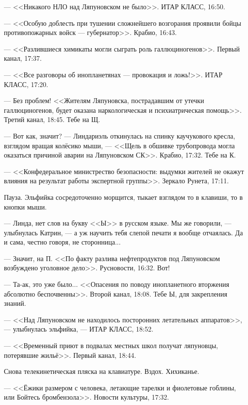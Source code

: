\emptypar


\emptypar







--- <<Никакого НЛО над Ляпуновском не было>>. ИТАР КЛАСС, 16:50.

--- <<Особую доблесть при тушении сложнейшего возгорания проявили бойцы противопожарных войск --- губернатор>>. Крабио, 16:43.

--- <<Разлившиеся химикаты могли сыграть роль галлюциногенов>>. Первый канал, 17:37.

--- <<Все разговоры об инопланетянах --- провокация и ложь!>>. ИТАР КЛАСС, 17:20.

--- Без проблем! <<Жителям Ляпуновска, пострадавшим от утечки галлюциногенов,
будет оказана наркологическая и психиатрическая помощь>>. Третий канал, 18:45. Тебе на Щ.

--- Вот как, значит? --- Линдариэль откинулась на спинку каучукового кресла, взглядом вращая колёсико мыши,
--- <<Щель в обшивке трубопровода могла оказаться причиной аварии на Ляпуновском СК>>. Крабио, 17:32. Тебе на К.

--- <<Конфедеральное министрество безопасности: выдумки жителей не окажут влияния на результат работы экспертной группы>>.
Зеркало Рунета, 17:11.

Пауза. Эльфийка сосредоточенно морщится, тыкает взглядом то в клавиши, то в кнопки мыши.

--- Линда, нет слов на букву <<Ы>> в русском языке. Мы же говорили, --- улыбнулась Катрин,
--- а уж научить тебя слепой печати я вообще отчаялась. Да и сама, честно говоря, не сторонница...

--- Значит, на П. <<По факту разлива нефтепродуктов под Ляпуновском возбуждено уголовное дело>>. Русновости, 16:32. Вот!

--- Та-ак, это уже было... <<Опасения по поводу инопланетного вторжения абсолютно беспочвенны>>.
Второй канал, 18:08. Тебе Ы, для закрепления знаний.

--- <<Над Ляпуновском не находилось посторонних летательных аппаратов>>, --- улыбнулась эльфийка, --- ИТАР КЛАСС, 18:52.

--- <<Временный приют в подвалах местных школ получат ляпуновцы, потерявшие жильё>>. Первый канал, 18:44.

Снова телекинетическая пляска на клавиатуре. Вздох. Хихиканье.

--- <<Ёжики размером с человека, летающие тарелки и фиолетовые гоблины, или Бойтесь бромбензола>>. Новости культуры, 17:32.


